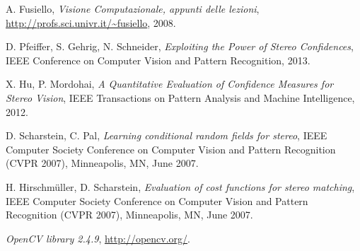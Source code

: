 \documentclass[12pt]{report}
\begin{document}
				
	\begin{thebibliography}{1}
		
		A. Fusiello,
		\emph{Visione Computazionale, appunti delle lezioni},
		\url{http://profs.sci.univr.it/~fusiello},
		2008.

		D. Pfeiffer, S. Gehrig, N. Schneider,
		\emph{Exploiting the Power of Stereo Confidences},
		IEEE Conference on Computer Vision and Pattern Recognition, 2013.
	
		X. Hu, P. Mordohai,
		\emph{A Quantitative Evaluation of Confidence Measures for Stereo Vision},
		IEEE Transactions on Pattern Analysis and Machine Intelligence, 2012.
		
		D. Scharstein, C. Pal,
		\emph{Learning conditional random fields for stereo},
		IEEE Computer Society Conference on Computer Vision and Pattern Recognition (CVPR 2007), Minneapolis, MN, June 2007.
		
		H. Hirschmüller, D. Scharstein,
		\emph{Evaluation of cost functions for stereo matching},
		IEEE Computer Society Conference on Computer Vision and Pattern Recognition (CVPR 2007), Minneapolis, MN, June 2007.
		
		\emph{OpenCV library 2.4.9},
		\url{http://opencv.org/}.
		
		
	\end{thebibliography}	
	
\end{document}
